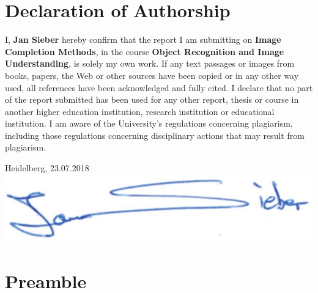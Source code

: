 \documentclass[
     11pt,         %
     a4paper,      %
     oneside,
     ]{article}
\newcommand{\mytitle}{Image Completion Methods}
\newcommand{\myauthor}{Jan Sieber}
\newcommand{\myseminar}{Object Recognition and Image Understanding}
\newcommand{\generalDate}{23.07.2018}
\begin{document}
\section*{Declaration of Authorship}
\vspace*{100pt}
I, \textbf{\myauthor} hereby confirm that the report I am submitting on \textbf{\mytitle}, in the course \textbf{\myseminar}, is solely my own work. If any text passages or images from books, papers,
the Web or other sources have been copied or in any other way used, all references have been acknowledged and fully cited.
I declare that no part of the report submitted has been used for any other report, thesis or course in
another higher education institution, research institution or educational institution. I am aware of the University's regulations concerning
plagiarism, including those regulations concerning disciplinary actions that may result from plagiarism.
\vspace*{50pt}

Heidelberg, \generalDate \hspace{2cm} \underline{\includegraphics[scale=0.2]{images/unterschrift.PNG}}
\newpage




\newpage
\section*{Preamble}


\newpage
\tableofcontents
\newpage

\end{document}
